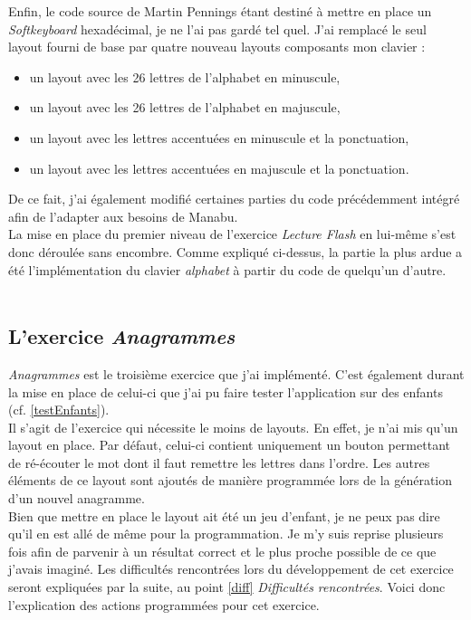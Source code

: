 Enfin, le code source de Martin Pennings étant destiné à mettre en place un \textit{Softkeyboard} hexadécimal, je ne l'ai pas gardé tel quel. J'ai remplacé le seul layout fourni de base par quatre nouveau layouts composants mon clavier :
\begin{itemize}
\item un layout avec les 26 lettres de l'alphabet en minuscule,
\item un layout avec les 26 lettres de l'alphabet en majuscule,
\item un layout avec les lettres accentuées en minuscule et la ponctuation,
\item un layout avec les lettres accentuées en majuscule et la ponctuation.
\end{itemize}
De ce fait, j'ai également modifié certaines parties du code précédemment intégré afin de l'adapter aux besoins de Manabu.\\

La mise en place du premier niveau de l'exercice \textit{Lecture Flash} en lui-même s'est donc déroulée sans encombre. Comme expliqué ci-dessus, la partie la plus ardue a été l'implémentation du clavier \textit{alphabet} à partir du code de quelqu'un d'autre.\\\\
	
\subsection{L'exercice \textit{Anagrammes}}
\textit{Anagrammes} est le troisième exercice que j'ai implémenté. C'est également durant la mise en place de celui-ci que j'ai pu faire tester l'application sur des enfants (cf. \ref{testEnfants}).\\

Il s'agit de l'exercice qui nécessite le moins de layouts. En effet, je n'ai mis qu'un layout en place. Par défaut, celui-ci contient uniquement un bouton permettant de ré-écouter le mot dont il faut remettre les lettres dans l'ordre. Les autres éléments de ce layout sont ajoutés de manière programmée lors de la génération d'un nouvel anagramme.\\

Bien que mettre en place le layout ait été un jeu d'enfant, je ne peux pas dire qu'il en est allé de même pour la programmation. Je m'y suis reprise plusieurs fois afin de parvenir à un résultat correct et le plus proche possible de ce que j'avais imaginé. Les difficultés rencontrées lors du développement de cet exercice seront expliquées par la suite, au point \ref{diff} \textit{Difficultés rencontrées}. Voici donc l'explication des actions programmées pour cet exercice.\\

